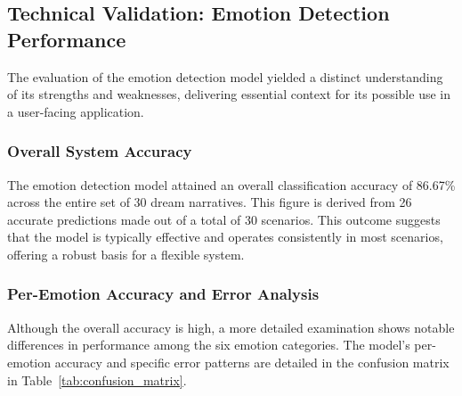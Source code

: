\documentclass[conference]{IEEEtran}
\begin{document}
	\subsection{Technical Validation: Emotion Detection Performance}
	The evaluation of the emotion detection model yielded a distinct understanding of its strengths and weaknesses, delivering essential context for its possible use in a user-facing application.
	
	\subsubsection{Overall System Accuracy}
	The emotion detection model attained an overall classification accuracy of 86.67\% across the entire set of 30 dream narratives. This figure is derived from 26 accurate predictions made out of a total of 30 scenarios. This outcome suggests that the model is typically effective and operates consistently in most scenarios, offering a robust basis for a flexible system.
	
	\subsubsection{Per-Emotion Accuracy and Error Analysis}
	Although the overall accuracy is high, a more detailed examination shows notable differences in performance among the six emotion categories. The model's per-emotion accuracy and specific error patterns are detailed in the confusion matrix in Table~\ref{tab:confusion_matrix}.
	
	\begin{table}[t]
		\caption{CONFUSION MATRIX AND PER-EMOTION ACCURACY}
		\label{tab:confusion_matrix}
		\centering
	\end{table}
	
\end{document}
